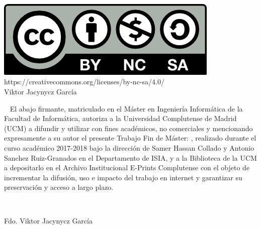 {\mbox{ }

\begin{Huge}
  \begin{center}
    \tituloPortadaVal
  \end{center}
\end{Huge}

\vfill %

\begin{large}
  \begin{center}
    \textoPrimerSubtituloPortadaVal\ \leavevmode \\\relax \mbox{ } \leavevmode
    \\\relax \mbox{ } \leavevmode \\\relax
    \textoSegundoSubtituloPortadaVal \leavevmode \\[0.3em]
  \end{center}
\end{large}

\vfill %

\begin{large}
  \begin{center}
    \textbf{\institucionVal}\leavevmode \\[0.2em]
    \mbox{ } \leavevmode \\\relax \textbf{\fechaPublicacionVal}
  \end{center}
\end{large}


\newpage
\thispagestyle{empty} \mbox{ }

\vskip 15cm
\begin{center}
  \includegraphics{TeXiS/by-nc-sa.png}\\%
  https://creativecommons.org/licenses/by-nc-sa/4.0/\\%
  Viktor Jacynycz García
 \end{center}
\newpage
\thispagestyle{empty} \mbox{ } \vskip 5cm El abajo firmante, matriculado en el
Máster en Ingeniería Informática de la Facultad de Informática, autoriza a la
Universidad Complutense de Madrid (UCM) a difundir y utilizar con fines
académicos, no comerciales y mencionando expresamente a su autor el presente
Trabajo Fin de Máster: \emph{\tituloPortadaVal}, realizado durante el curso
académico 2017-2018 bajo la dirección de Samer Hassan Collado y Antonio Sanchez
Ruiz-Granados en el Departamento de ISIA, y a la Biblioteca de la UCM a
depositarlo en el Archivo Institucional E-Prints Complutense con el objeto de
incrementar la difusión, uso e impacto del trabajo en internet y garantizar su
preservación y acceso a largo plazo.

\mbox{ } \vskip 5cm
\begin{center}
Fdo. Viktor Jacynycz García
\end{center}
}%

